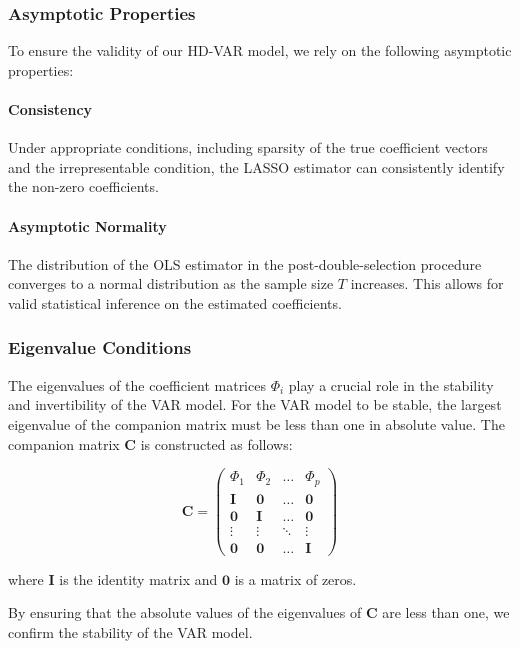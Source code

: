 \documentclass[12pt]{article}
\begin{document}
\subsubsection{Asymptotic Properties}

To ensure the validity of our HD-VAR model, we rely on the following asymptotic properties:

\paragraph{Consistency}
Under appropriate conditions, including sparsity of the true coefficient vectors and the irrepresentable condition, the LASSO estimator can consistently identify the non-zero coefficients.

\paragraph{Asymptotic Normality}
The distribution of the OLS estimator in the post-double-selection procedure converges to a normal distribution as the sample size \(T\) increases. This allows for valid statistical inference on the estimated coefficients.

\subsubsection{Eigenvalue Conditions}

The eigenvalues of the coefficient matrices \(\Phi_i\) play a crucial role in the stability and invertibility of the VAR model. For the VAR model to be stable, the largest eigenvalue of the companion matrix must be less than one in absolute value. The companion matrix \(\mathbf{C}\) is constructed as follows:

\[
\mathbf{C} = \begin{pmatrix}
\Phi_1 & \Phi_2 & \ldots & \Phi_p \\
\mathbf{I} & \mathbf{0} & \ldots & \mathbf{0} \\
\mathbf{0} & \mathbf{I} & \ldots & \mathbf{0} \\
\vdots & \vdots & \ddots & \vdots \\
\mathbf{0} & \mathbf{0} & \ldots & \mathbf{I}
\end{pmatrix}
\]

where \(\mathbf{I}\) is the identity matrix and \(\mathbf{0}\) is a matrix of zeros.

By ensuring that the absolute values of the eigenvalues of \(\mathbf{C}\) are less than one, we confirm the stability of the VAR model.
\end{document}
